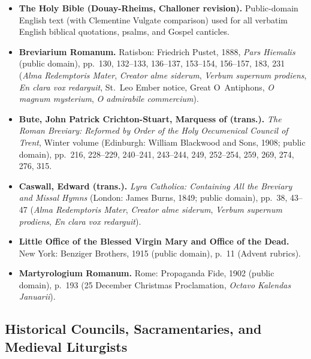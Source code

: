 \begin{itemize}
\item \textbf{The Holy Bible (Douay-Rheims, Challoner revision).} Public-domain English text (with Clementine Vulgate comparison) used for all verbatim English biblical quotations, psalms, and Gospel canticles.
\item \textbf{Breviarium Romanum.} Ratisbon: Friedrich Pustet, 1888, \textit{Pars Hiemalis} (public domain), pp.~130, 132--133, 136--137, 153--154, 156--157, 183, 231 (\textit{Alma Redemptoris Mater}, \textit{Creator alme siderum}, \textit{Verbum supernum prodiens}, \textit{En clara vox redarguit}, St.~Leo Ember notice, Great O~Antiphons, \textit{O magnum mysterium}, \textit{O admirabile commercium}).
\item \textbf{Bute, John Patrick Crichton-Stuart, Marquess of (trans.).} \textit{The Roman Breviary: Reformed by Order of the Holy Oecumenical Council of Trent}, Winter volume (Edinburgh: William Blackwood and Sons, 1908; public domain), pp.~216, 228--229, 240--241, 243--244, 249, 252--254, 259, 269, 274, 276, 315.
\item \textbf{Caswall, Edward (trans.).} \textit{Lyra Catholica: Containing All the Breviary and Missal Hymns} (London: James Burns, 1849; public domain), pp.~38, 43--47 (\textit{Alma Redemptoris Mater}, \textit{Creator alme siderum}, \textit{Verbum supernum prodiens}, \textit{En clara vox redarguit}).
\item \textbf{Little Office of the Blessed Virgin Mary and Office of the Dead.} New York: Benziger Brothers, 1915 (public domain), p.~11 (Advent rubrics).
\item \textbf{Martyrologium Romanum.} Rome: Propaganda Fide, 1902 (public domain), p.~193 (25 December Christmas Proclamation, \textit{Octavo Kalendas Januarii}).
\end{itemize}

\subsection*{Historical Councils, Sacramentaries, and Medieval Liturgists}

